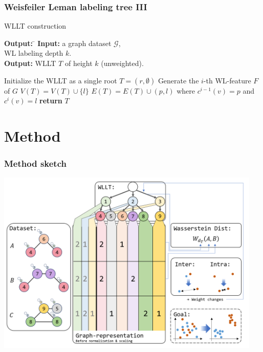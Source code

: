 \begin{frame} \frametitle{Weisfeiler Leman labeling tree III}
	\begin{algorithm}[H]
		\caption{WLLT construction} \label{alg:WLLTconstruction} 
		\begin{tabbing}
			\textbf{Output:} \= \kill
			\textbf{Input:} \>a graph dataset $\mathcal{G}$,\\
			\>WL labeling depth $k$.\\
			\textbf{Output:} \>WLLT $T$ of height $k$ (unweighted).
		\end{tabbing}	
		\begin{algorithmic}[1]		
			\State Initialize the WLLT as a single root $T=({r}, \emptyset)$
			\State Generate the $i$-th WL-feature $F$ of $G$
			\State $V(T) = V(T) \cup \{ l \}$
			\State $E(T) = E(T) \cup (p, l)$ where $c^{i-1}(v)=p$ and $c^{i}(v)=l$ 
			\EndIf					
			\EndFor
			\EndFor
			\EndFor
			\State \textbf{return} $T$
		\end{algorithmic}
	\end{algorithm}	
\end{frame}

\section{Method}

\begin{frame} \frametitle{Method sketch}
\vspace{-0.75cm}
\includegraphics[width=0.95\textwidth]{images/WLLTProgram6}
\end{frame}



